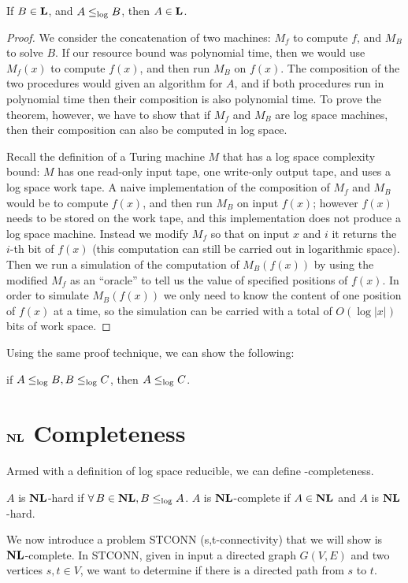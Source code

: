 \begin{Thm} If $B \in \dl$, and $A \leq_{\log} B$, then $A \in \dl$. 
\end{Thm}
\begin{proof} 
    We consider the concatenation of two machines: $M_f$ to compute $f$,
    and $M_B$ to solve $B$. If our resource bound was polynomial time, 
    then we would use $M_f(x)$ to compute
    $f(x)$, and then run $M_B$ on $f(x)$. The composition of the
    two procedures would given an algorithm for $A$, and if both
    procedures run in polynomial time then their composition is
    also polynomial time. To prove the theorem, however, we have
    to show that if $M_f$ and $M_B$ are log space machines, then
    their composition can also be computed in log space.
    
    Recall the definition of a Turing machine $M$ that has a log space
    complexity bound: $M$ has one read-only input tape, one write-only
    output tape, and uses a log space work tape.  A
    naive implementation of the composition of $M_f$ and $M_B$
    would be to compute $f(x)$, and then run $M_B$ on input $f(x)$;
    however $f(x)$ needs to be stored on the work tape, and this
    implementation does not produce a log space machine.
    Instead we modify $M_f$ so that on input $x$ and $i$ it
    returns the $i$-th bit of $f(x)$ (this computation can still
    be carried out in logarithmic space). Then we run a 
    simulation of the computation of $M_B(f(x))$ by using
    the modified $M_f$ as an ``oracle'' to tell us the value
    of specified positions of $f(x)$. In order to simulate $M_B(f(x))$
    we only need to know the content of one position of $f(x)$ at a
    time, so the simulation can be carried with a total of
    $O(\log |x|)$ bits of work space.
\end{proof}

Using the same proof technique, we can show the following:
\begin{Thm}
    if $A \leq_{\log} B, B \leq_{\log} C$, then $ A \leq_{\log} C$.
\end{Thm}
\section{$\nl$ Completeness}
Armed with a definition of log space reducible, we can define
\nl-completeness.
\begin{Def}
$A$ is $\nl$-hard if $\forall\, B  \in \nl, B \logred A$. 
$A$ is $\nl$-complete if 
$A \in \nl$  and $A$ is $\nl$-hard.
\end{Def}
We now introduce a problem STCONN (s,t-connectivity) that we will show
is $\nl$-complete. In  STCONN, given in input  a directed graph
$G(V,E)$ and two vertices $s, t \in V$, we want to determine if 
there is  a
directed path from $s $ to $t$.


